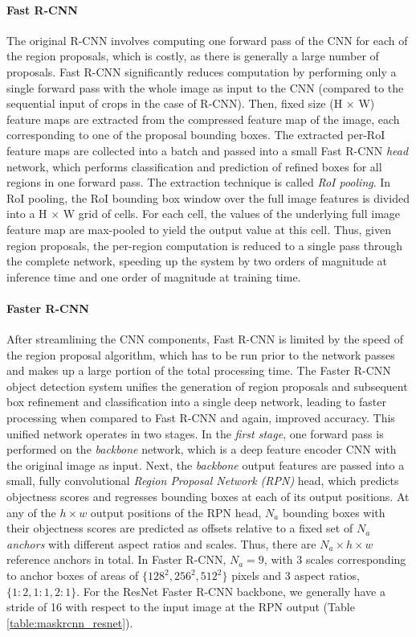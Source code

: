 \paragraph{Fast R-CNN}
The original R-CNN involves computing one forward pass of the CNN for each of the region proposals,
which is costly, as there is generally a large number of proposals.
Fast R-CNN \cite{FastRCNN} significantly reduces computation by performing only a single forward pass with the whole image
as input to the CNN (compared to the sequential input of crops in the case of R-CNN).
Then, fixed size (H $\times$ W) feature maps are extracted from the compressed feature map of the image,
each corresponding to one of the proposal bounding boxes.
The extracted per-RoI feature maps are collected into a batch and passed into a small Fast R-CNN
\emph{head} network, which performs classification and prediction of refined boxes for all regions in one forward pass.
The extraction technique is called \emph{RoI pooling}. In RoI pooling, the RoI bounding box window over the full image features
is divided into a H $\times$ W grid of cells. For each cell, the values of the underlying
full image feature map are max-pooled to yield the output value at this cell.
Thus, given region proposals, the per-region computation is reduced to a single pass through the complete network,
speeding up the system by two orders of magnitude at inference time and one order of magnitude
at training time.

\paragraph{Faster R-CNN}
After streamlining the CNN components, Fast R-CNN is limited by the speed of the region proposal
algorithm, which has to be run prior to the network passes and makes up a large portion of the total
processing time.
The Faster R-CNN object detection system \cite{FasterRCNN} unifies the generation of region proposals and subsequent box refinement and
classification into a single deep network, leading to faster processing when compared to Fast R-CNN
and again, improved accuracy.
This unified network operates in two stages.
In the \emph{first stage}, one forward pass is performed on the \emph{backbone} network,
which is a deep feature encoder CNN with the original image as input.
Next, the \emph{backbone} output features are passed into a small, fully convolutional \emph{Region Proposal Network (RPN)} head, which
predicts objectness scores and regresses bounding boxes at each of its output positions.
At any of the $h \times w$ output positions of the RPN head,
$N_a$ bounding boxes with their objectness scores are predicted as offsets relative to a fixed set of $N_a$ \emph{anchors} with different
aspect ratios and scales. Thus, there are $N_a \times h \times w$ reference anchors in total.
In Faster R-CNN, $N_a = 9$, with 3 scales corresponding
to anchor boxes of areas of $\{128^2, 256^2, 512^2\}$ pixels and 3 aspect ratios,
$\{1:2, 1:1, 2:1\}$. For the ResNet Faster R-CNN backbone, we generally have a stride of 16
with respect to the input image at the RPN output (Table \ref{table:maskrcnn_resnet}).

